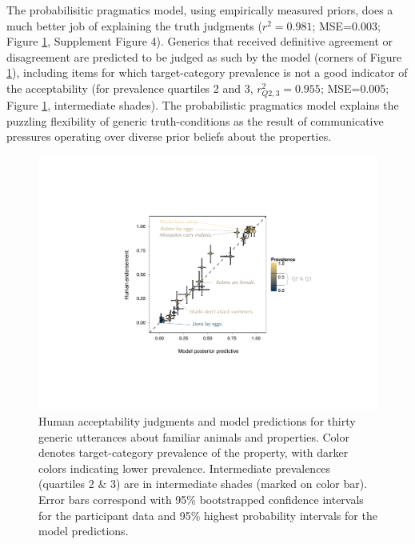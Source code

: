 \documentclass{pnastwo}
\begin{document}
\begin{article}

The probabilisitic pragmatics model, using empirically measured priors, does a much better job of explaining the truth judgments ($r^2=0.981$; MSE=0.003; Figure \ref{fig:modeldataBars}, Supplement Figure 4). 
Generics that received definitive agreement or disagreement are predicted to be judged as such by the model (corners of Figure \ref{fig:modeldataBars}), including items for which target-category prevalence is not a good indicator of the acceptability (for prevalence quartiles 2 and 3, $r_{Q2,3}^2=0.955$; MSE=0.005; Figure \ref{fig:modeldataBars}, intermediate shades).
The probabilistic pragmatics model explains the puzzling flexibility of generic truth-conditions as the result of communicative pressures operating over diverse prior beliefs about the properties. 

\begin{figure}
\centering
    \includegraphics[width=0.7\columnwidth]{truthjudge-scatter-wLabels.pdf}
    \caption{Human acceptability judgments and model predictions for thirty generic utterances about familiar animals and properties. 
    Color denotes target-category prevalence of the property, with darker colors indicating lower prevalence. 
    Intermediate prevalences (quartiles 2 \& 3) are in intermediate shades (marked on color bar).
    Error bars correspond with 95\% bootstrapped confidence intervals for the participant data and 95\% highest probability intervals for the model predictions.
    }
  \label{fig:modeldataBars}
\end{figure}


\end{article}
\end{document}
